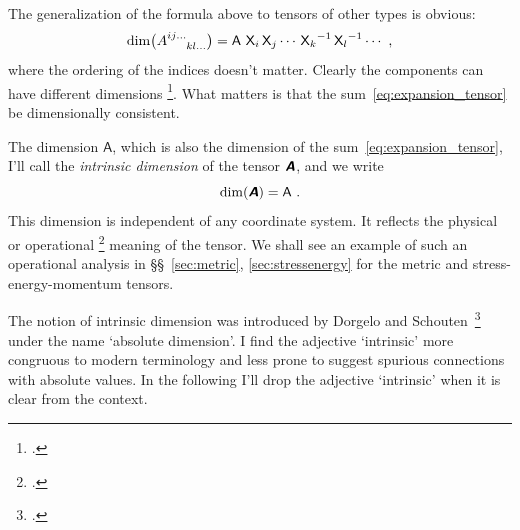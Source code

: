 \documentclass[\ifafour a4paper,12pt,\else a5paper,10pt,\fi%
onecolumn,oneside,article,%
british%
]{memoir}
\newcommand*{\defquote}[1]{`#1'}
\theoremstyle{remark}
\theoremstyle{innote}
\newcommand*{\mathte}[1]{\textbf{\textit{\textsf{#1}}}}
\newcommand*{\citep}{\footcites}
\renewcommand*{\|}[1][]{\nonscript\,#1\vert\nonscript\;\mathopen{}}
\newcommand*{\sect}{\S}%
\newcommand*{\sects}{\S\S}%
\newcommand*{\chap}{ch.}%
\newcommand*{\cf}{{cf.}}
\newcommand*{\Un}{\textsf{1}}
\newcommand*{\Le}{\textsf{L}}
\newcommand*{\Ti}{\textsf{T}}
\newcommand*{\Ma}{\textsf{M}}
\newcommand*{\Te}{\Theta}
\newcommand*{\Xx}{\textsf{X}}
\newcommand*{\Aa}{\textsf{A}}
\newcommand*{\yA}{\mathte{A}}
\renewcommand*{\i}{\indices}
\begin{document}
The generalization of the formula above to tensors of other types is obvious:
\begin{equation}
  \label{eq:dim_component_generic}
\dim\bigl(A\i{^{ij\dotso}_{kl\dotso}}\bigr) = \Aa\ {\Xx_{i}}\,{\Xx_{j}}\dotsm\,
  {\Xx_{k}}^{-1}\,{\Xx_{l}}^{-1}\dotsm \ ,
\end{equation}
where the ordering of the indices doesn't matter.
Clearly the components can have different dimensions \citep[\cf\ the
discussion in][\sect~IV.5 p.~179]{synge1960b}. What matters is that the
sum~\eqref{eq:expansion_tensor} be dimensionally consistent.


\medskip

The dimension $\Aa$, which is also the dimension of the
sum~\eqref{eq:expansion_tensor}, I'll call the \emph{intrinsic dimension}
of the tensor $\yA$, and we write
\begin{equation}
  \label{eq:abs_dim}
  \dim(\yA) = \Aa\ .
\end{equation}
This dimension is independent of any coordinate system. It reflects the
physical or operational \citep{bridgman1927_r1958}[see
also][\sect~A.2]{synge1960}[\sects~A.3--4]{truesdelletal1960} meaning of
the tensor. We shall see an example of such an operational analysis in
\sects~\ref{sec:metric}, \ref{sec:stressenergy} for the metric and
stress-energy-momentum tensors.

The notion of intrinsic dimension was introduced by Dorgelo and
Schouten~\citep{dorgeloetal1946}[\chap~VI]{schouten1951_r1989} under the
name \defquote{absolute dimension}. I find the adjective
\defquote{intrinsic} more congruous to modern terminology and less prone to
suggest spurious connections with absolute values.
In the following I'll drop the adjective \defquote{intrinsic} when it is
clear from the context.
\end{document}
